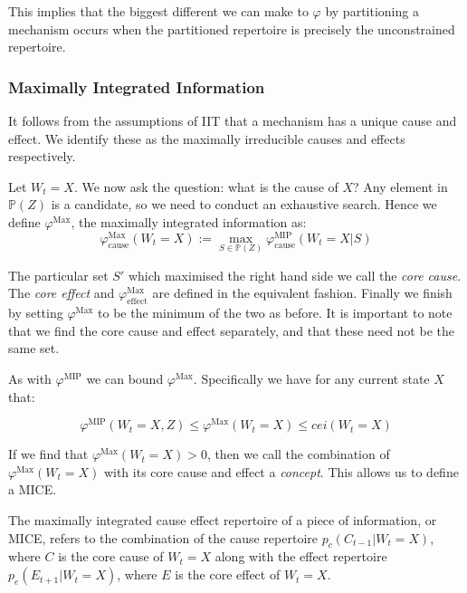 This implies that the biggest different we can make to $\varphi$ by partitioning a mechanism occurs when the partitioned repertoire is precisely the unconstrained repertoire. 



\subsubsection{Maximally Integrated Information}
It follows from the assumptions of IIT that a mechanism has a unique cause and effect. We identify these as the maximally irreducible causes and effects respectively. 

Let $W_t = X$. We now ask the question: what is the cause of $X$? Any element in $\mathbb{P}(Z)$ is a candidate, so we need to conduct an exhaustive search. Hence we define $\varphi^{\text{Max}}$, the maximally integrated information as: 
\begin{equation}
\label{def:core_cause}
\varphi^{\text{Max}}_{\text{cause}}(W_t = X):=\max \limits_{S \in \mathbb{P}(Z)}\varphi^{\text{MIP}}_{\text{cause}}(W_t = X|S)
\end{equation}

The particular set $S'$ which maximised the right hand side we call the \textit{core cause}. The \textit{core effect} and $\varphi^{\text{Max}}_{\text{effect}}$ are defined in the equivalent fashion. Finally we finish  by setting $\varphi^{\text{Max}}$ to be the minimum of the two as before. It is important to note that we find the core cause and effect separately, and that these need not be the same set.

As with $\varphi^{\text{MIP}}$ we can bound $\varphi^{\text{Max}}$. Specifically we have for any current state $X$ that:

\begin{equation}
\label{eq:bound_phimax}
\varphi^{\text{MIP}}(W_t = X, Z) \leq \varphi^{\text{Max}}(W_t = X)\leq cei(W_t = X)
\end{equation}

If we find that $\varphi^{\text{Max}}(W_t = X)>0$, then we call the combination of $\varphi^{\text{Max}}(W_t = X)$ with its core cause and effect a \textit{concept}. This allows us to define a MICE.

\begin{definition}
	{The maximally integrated cause effect repertoire of a piece of information, or MICE, refers to the combination of the cause repertoire $p_c(C_{t-1}|W_t = X)$, where $C$ is the core cause of $W_t=X$ along with the effect repertoire $p_e(E_{t+1}|W_t = X)$, where $E$ is the core effect of $W_t = X$.}
\end{definition}

